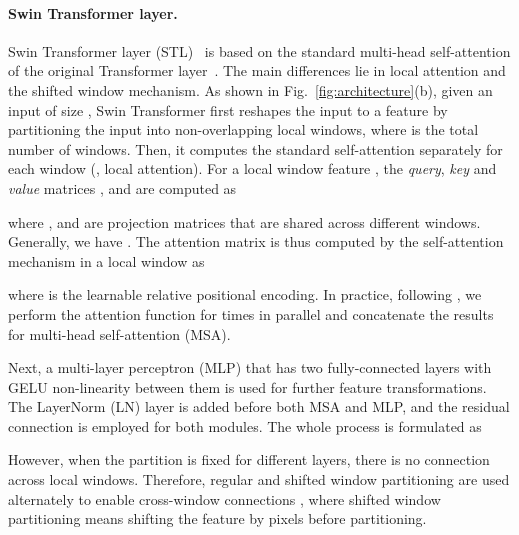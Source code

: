 \documentclass[10pt,twocolumn,letterpaper]{article}
\newcommand{\R}[1]{\textcolor[rgb]{1.00,0.00,0.00}{#1}}
\newlength \g
\begin{document}
\vspace{-0.4cm}
\paragraph{Swin Transformer layer.} Swin Transformer layer (STL)~\cite{liu2021swin} is based on the standard multi-head self-attention of the original Transformer layer~\cite{vaswani2017transformer}. The main differences lie in local attention and the shifted window mechanism. 
As shown in Fig.~\ref{fig:architecture}\R{(b)}, given an input of size , Swin Transformer first reshapes the input to a  feature by partitioning the input into non-overlapping  local windows, where  is the total number of windows. Then, it computes the standard self-attention separately for each window (\ie, local attention). For a local window feature , the \textit{query}, \textit{key} and \textit{value} matrices ,  and  are computed as

where ,  and  are projection matrices that are shared across different windows. Generally, we have . The attention matrix is thus computed by the self-attention mechanism in a local window as

where  is the learnable relative positional encoding. In practice, following \cite{vaswani2017transformer}, we perform the attention function for  times in parallel and concatenate the results for multi-head self-attention (MSA). 

Next, a multi-layer perceptron (MLP) that has two fully-connected layers with GELU non-linearity between them is used for further feature transformations. The LayerNorm (LN) layer is added before both MSA and MLP, and the residual connection is employed for both modules. The whole process is formulated as


However, when the partition is fixed for different layers, there is no connection across local windows. Therefore, regular and shifted window partitioning are used alternately to enable cross-window connections \cite{liu2021swin}, where shifted window partitioning means shifting the feature by  pixels before partitioning.
\end{document}
